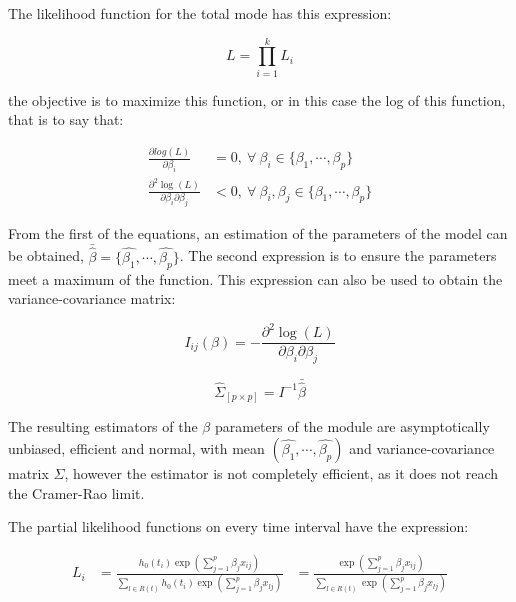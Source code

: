\documentclass[11pt]{book} %
\begin{document}
      The likelihood function for the total mode has this expression:

      \begin{equation}
        L = \prod_{i=1}^kL_i
        \label{eq:cox-partial-likelihood-prod}
      \end{equation}

      the objective is to maximize this function, or in this case the log of this function, that is to say that:

      \begin{equation}
        \begin{aligned}
          \frac{\partial log(L)}{\partial\beta_i} & = 0, \ \forall \ \beta_i \in \{\beta_1,\cdots,\beta_p\} \\
          \frac{\partial^2 \log(L)}{\partial\beta_i\partial\beta_j} & < 0,  \ \forall \ \beta_i,\beta_j \in \{\beta_1,\cdots,\beta_p\}
        \end{aligned}
        \label{eq:cox-max-likelihood-conditions}
      \end{equation}

      From the first of the equations, an estimation of the parameters of the model can be obtained, $\bar{\hat{\beta}} = \{\hat{\beta_1},\cdots,\hat{\beta_p}\}$. The second expression is to ensure the parameters meet a maximum of the function. This expression can also be used to obtain the variance-covariance matrix:

      \begin{equation}
        I_{ij}(\beta) = - \frac{\partial^2\log(L)}{\partial\beta_i\partial\beta_j}
        \label{eq:cox-information matrix}
      \end{equation}

      \begin{equation}
        \hat{\Sigma}_{[p\times p]} = I ^{-1} \bar{\hat{\beta}}
        \label{eq:cox-variance-covariance-matrix-estimated}
      \end{equation}

      The resulting estimators of the $\beta$ parameters of the module are asymptotically unbiased, efficient and normal, with mean $(\hat{\beta_1},\cdots,\hat{\beta_p})$ and variance-covariance matrix $\hat{\Sigma}$, however the estimator is not completely efficient, as it does not reach the Cramer-Rao limit.

      The partial likelihood functions on every time interval have the expression:

      \begin{equation}
        \begin{aligned}
          L_i & = \frac{h_0(t_i)\exp\left(\sum_{j=1}^p\beta_jx_{ij}\right)}{\sum_{l\in R(t)}h_0(t_i)\exp\left(\sum_{j=1}^p\beta_jx_{lj}\right)}
          & = \frac{\exp\left(\sum_{j=1}^p\beta_jx_{ij}\right)}{\sum_{l\in R(t)}\exp\left(\sum_{j=1}^p\beta_jx_{lj}\right)}
        \end{aligned}
        \label{eq:cox-partial-likelihood-expression}
      \end{equation}
\end{document}
